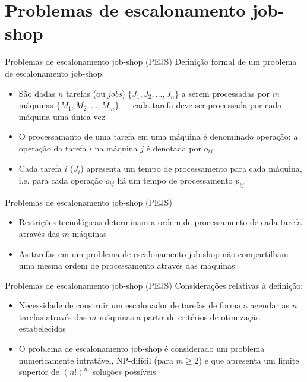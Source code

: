 \documentclass{beamer}
\begin{document}
\section{Problemas de escalonamento job-shop}
\begin{frame}{Problemas de escalonamento job-shop (PEJS)}
Definição formal de um problema de escalonamento job-shop:
\begin{itemize}
\item<1-> São dadas $n$ tarefas (ou \textit{jobs}) $ \{ J_{1}, J_{2}, ..., J_{n} \} $ a serem processadas por $m$ m\'{a}quinas 
$\{ M_{1}, M_{2}, ..., M_{m} \}$ --- cada tarefa deve ser processada por cada m\'{a}quina uma \'{u}nica vez
\item<2-> O processamanto de uma tarefa em uma m\'{a}quina \'{e} denominado opera\c{c}\~{a}o: a opera\c{c}\~{a}o da tarefa $i$
na m\'{a}quina $j$ \'{e} denotada por $o_{ij}$
\item<3-> Cada tarefa $i$  ($J_{i}$) apresenta um tempo de processamento para cada m\'{a}quina, i.e. para cada opera\c{c}\~{a}o
$o_{ij}$ h\'{a} um tempo de processamento $p_{ij}$
\end{itemize}
\end{frame}
\begin{frame}{Problemas de escalonamento job-shop (PEJS)}
\begin{itemize}
\item<1-> Restri\c{c}\~{o}es tecnol\'{o}gicas determinam a ordem de processamento de cada tarefa atrav\'{e}s das $m$ m\'{a}quinas
\item<2-> As tarefas em um problema de escalonamento job-shop n\~{a}o compartilham uma mesma ordem de processamento atrav\'{e}s
das m\'{a}quinas
\end{itemize}
\end{frame}
\begin{frame}{Problemas de escalonamento job-shop (PEJS)}
Considerações relativas à definição:
\begin{itemize}
\item<1-> Necessidade de construir um escalonador de tarefas de forma a agendar as $n$ tarefas atrav\'{e}s das $m$ m\'{a}quinas
a partir de critérios de otimização estabelecidos
\item<2-> O problema de escalonamento job-shop \'{e} considerado um problema numericamente intrat\'{a}vel, NP-dif\'{i}cil
(para $m \geq 2$) \cite{French1982} e que apresenta um limite superior de $(n!)^{m}$ solu\c{c}\~{o}es poss\'{i}veis
\end{itemize}
\end{frame}
\end{document}
